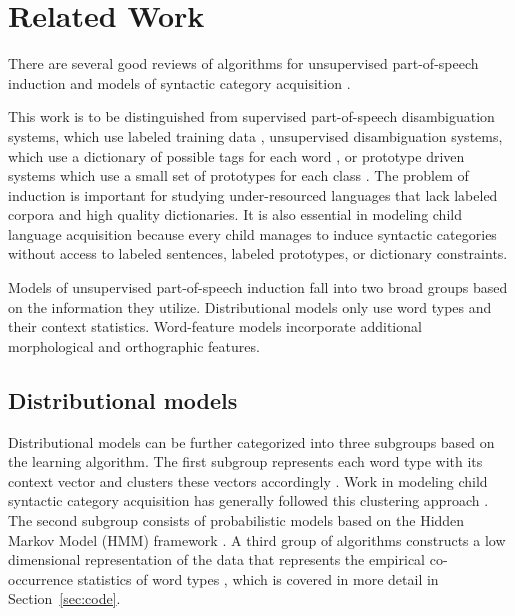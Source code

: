 \documentclass[11pt]{article}
\begin{document}
\section{Related Work}
\label{sec:related}
There are several good reviews of algorithms for unsupervised
part-of-speech induction
\cite{Christodoulopoulos:2010:TDU:1870658.1870714,Gao:2008:CBE:1613715.1613761}
and models of syntactic category acquisition \cite{ambridge2011child}.

This work is to be distinguished from supervised part-of-speech
disambiguation systems, which use labeled training data
\cite{Church:1988:SPP:974235.974260}, unsupervised disambiguation
systems, which use a dictionary of possible tags for each word
\cite{Merialdo:1994:TET:972525.972526}, or prototype driven systems
which use a small set of prototypes for each class
\cite{Haghighi:2006:PLS:1220835.1220876}.  The problem of induction is
important for studying under-resourced languages that lack labeled
corpora and high quality dictionaries.  It is also essential in
modeling child language acquisition because every child manages to
induce syntactic categories without access to labeled sentences,
labeled prototypes, or dictionary constraints.

Models of unsupervised part-of-speech induction fall into two broad
groups based on the information they utilize.  Distributional models
only use word types and their context statistics.  Word-feature models
incorporate additional morphological and orthographic features.

\subsection{Distributional models}

Distributional models can be further categorized into three subgroups
based on the learning algorithm.  The first subgroup represents each
word type with its context vector and clusters these vectors
accordingly \cite{Schutze:1995:DPT:976973.976994}.  Work in modeling
child syntactic category acquisition has generally followed this
clustering approach
\cite{redington1998distributional,mintz2003frequent}.  The second
subgroup consists of probabilistic models based on the Hidden Markov
Model (HMM) framework \cite{Brown:1992:CNG:176313.176316}.  A third
group of algorithms constructs a low dimensional representation of the
data that represents the empirical co-occurrence statistics of word
types \cite{globerson2007euclidean}, which is covered in more detail
in Section~\ref{sec:code}.
\end{document}
